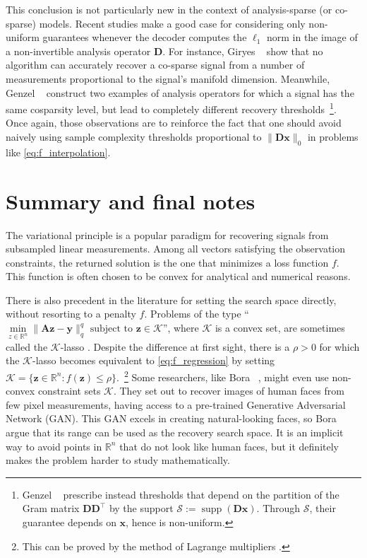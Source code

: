 This conclusion is not particularly new in the context of analysis-sparse (or co-sparse) models. Recent studies make a good case for considering only non-uniform guarantees whenever the decoder computes the $\ell_1$ norm in the image of a non-invertible analysis operator $\mathbf{D}$. For instance, Giryes \etal~\cite{giryes2015, giryes2015a} show that no algorithm can accurately recover a co-sparse signal from a number of measurements proportional to the signal's manifold dimension. Meanwhile, Genzel \etal~\cite{genzel2017a} construct two examples of analysis operators for which a signal has the same cosparsity level, but lead to completely different recovery thresholds~\footnote{Genzel \etal~\cite{genzel2017a} prescribe instead thresholds that depend on the partition of the Gram matrix $\mathbf{D} \mathbf{D}^\top$ by the support $\mathcal{S} := \operatorname{supp}\left ( \mathbf{Dx} \right )$. Through $\mathcal{S}$, their guarantee depends on $\mathbf{x}$, hence is non-uniform.}. Once again, those observations are to reinforce the fact that one should avoid naively using sample complexity thresholds proportional to $\|\mathbf{Dx}\|_0$ in problems like \eqref{eq:f_interpolation}.


\section{Summary and final notes}

The variational principle is a popular paradigm for recovering signals from subsampled linear measurements. Among all vectors satisfying the observation constraints, the returned solution is the one that minimizes a loss function $f$. This function is often chosen to be convex for analytical and numerical reasons.

There is also precedent in the literature for setting the search space directly, without resorting to a penalty $f$. Problems of the type ``$\underset{z \in \mathbb{R}^{n}}{\min} \| \mathbf{Az - y} \|_q^q \text{ subject to } \mathbf{z} \in \mathcal{K}$'', where $\mathcal{K}$ is a convex set, are sometimes called the $\mathcal{K}$-lasso \cite{plan2016}. Despite the difference at first sight, there is a $\rho > 0$ for which the $\mathcal{K}$-lasso becomes equivalent to \eqref{eq:f_regression} by setting $\mathcal{K} = \{\mathbf{z} \in \mathbb{R}^{n}: f(\mathbf{z}) \leq \rho \}$.~\footnote{This can be proved by the method of Lagrange multipliers \cite[Chapter 5]{boyd2009}.} Some researchers, like Bora \etal~\cite{bora2017a}, might even use non-convex constraint sets $\mathcal{K}$. They set out to recover images of human faces from few pixel measurements, having access to a pre-trained Generative Adversarial Network (GAN). This GAN excels in creating natural-looking faces, so Bora \etal \, argue that its range can be used as the recovery search space. It is an implicit way to avoid points in $\mathbb{R}^{n}$ that do not look like human faces, but it definitely makes the problem harder to study mathematically.

